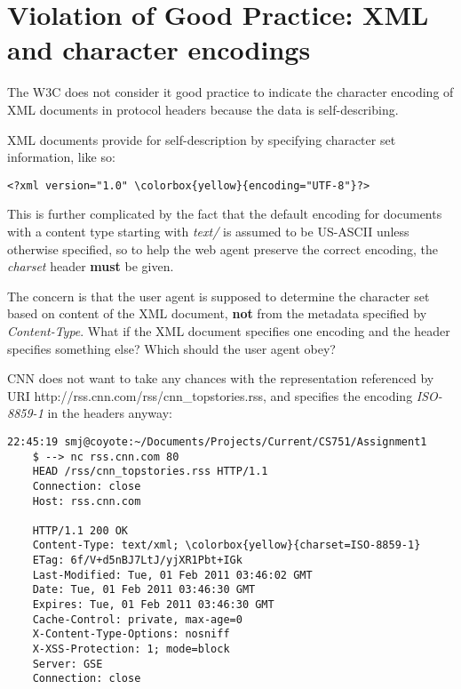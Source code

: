 \chapter{Violation of Good Practice: XML and character encodings}
\label{xml-and-character-encodings} 

The W3C does not consider it good practice to indicate the character encoding of XML documents in protocol headers because the data is self-describing.\cite{ArchOfWWW}

XML documents provide for self-description by specifying character set information, like so:
{\small
\begin{Verbatim}[commandchars=\\\{\}]
    <?xml version="1.0" \colorbox{yellow}{encoding="UTF-8"}?>
\end{Verbatim}
}

This is further complicated by the fact that the default encoding for documents with a content type starting with \emph{text/} is assumed to be US-ASCII unless otherwise specified,\cite{ArchOfWWW} so to help the web agent preserve the correct encoding, the \emph{charset} header \textbf{must} be given.

The concern is that the user agent is supposed to determine the character set based on content of the XML document, \textbf{not} from the metadata specified by \emph{Content-Type}.  What if the XML document specifies one encoding and the header specifies something else?  Which should the user agent obey?

CNN does not want to take any chances with the representation referenced by URI {\color{blue} http://rss.cnn.com/rss/cnn\_topstories.rss}, and specifies the encoding \emph{ISO-8859-1} in the headers anyway:
{\small
\begin{Verbatim}[commandchars=\\\{\}]
    22:45:19 smj@coyote:~/Documents/Projects/Current/CS751/Assignment1
    $ --> nc rss.cnn.com 80
    HEAD /rss/cnn_topstories.rss HTTP/1.1
    Connection: close
    Host: rss.cnn.com
    
    HTTP/1.1 200 OK
    Content-Type: text/xml; \colorbox{yellow}{charset=ISO-8859-1}
    ETag: 6f/V+d5nBJ7LtJ/yjXR1Pbt+IGk
    Last-Modified: Tue, 01 Feb 2011 03:46:02 GMT
    Date: Tue, 01 Feb 2011 03:46:30 GMT
    Expires: Tue, 01 Feb 2011 03:46:30 GMT
    Cache-Control: private, max-age=0
    X-Content-Type-Options: nosniff
    X-XSS-Protection: 1; mode=block
    Server: GSE
    Connection: close
\end{Verbatim}
}

